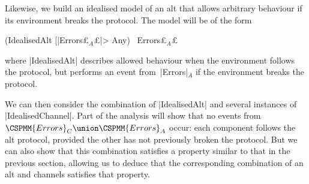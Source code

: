 Likewise, we build an idealised model of an alt that allows arbitrary
behaviour if its environment breaks the protocol.  The model will be of the
form 
%
\begin{cspm}
(IdealisedAlt [|Errors£$_A$£|> Any) \ Errors£$_A$£
\end{cspm}
%
where |IdealisedAlt| describes allowed behaviour when the environment follows
the protocol, but performs an event from~|Errors|$_A$ if the environment
breaks the protocol.

We can then consider the combination of |IdealisedAlt| and several instances
of |IdealisedChannel|.  Part of the analysis will show that no events from
$\CSPMM{Errors}_C \union \CSPMM{Errors}_A$ occur: each component follows the
alt protocol, provided the other has not previously broken the protocol.  But
we can also show that this combination satisfies a property similar to that in
the previous section, allowing us to deduce that the corresponding combination
of an alt and channels satisfies that property.

